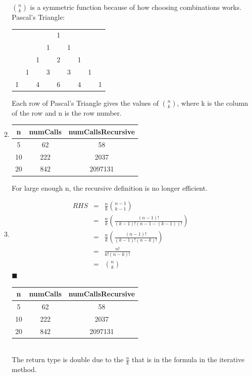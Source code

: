 \documentclass{article}
\newcommand*{\qed}{\hfill\ensuremath{\blacksquare}}
\begin{document}
\begin{enumerate}
$n\choose k$ is a symmetric function because of how choosing combinations works. Pascal's Triangle:\\
\begin{tabular}{ccccccccc}
	\hfill	&\hfill	&\hfill	& \hfill 	& 1	&\hfill	&\hfill	&\hfill	&\hfill\\
	\hfill	&\hfill	&\hfill	&1	& \hfill	& 1	& \hfill	&\hfill	&\hfill\\
	\hfill	&\hfill	&1	&\hfill	&2	&\hfill	&1	&\hfill	&\hfill\\
	\hfill	&1	&\hfill	&3	&\hfill	&3	&\hfill	&1	&\hfill\\
	1	&\hfill	&4	&\hfill	&6	&\hfill	&4	&\hfill	&1
\end{tabular}

Each row of Pascal's Triangle gives the values of $n\choose k$, where k is the column of the row and n is the row number. 

\item 
\begin{tabular}{|c|c|c|}
	\hline
	n	&numCalls	&numCallsRecursive \\
	\hline
	5	&62	&58 \\
	\hline
	10	&222		&2037 \\
	\hline
	20	&842		&2097131\\
	\hline
\end{tabular}

For large enough n, the recursive definition is no longer efficient. 

\item 
\begin{eqnarray*}
	RHS &=& \frac{n}{k}{{n-1}\choose{k-1}}\\
	&=& \frac{n}{k}\left(\frac{(n-1)!}{(k-1)!(n-1-(k-1))!}\right)\\
	&=& \frac{n}{k}\left(\frac{(n-1)!}{(k-1)!(n-k)!}\right)\\
	&=& \frac{n!}{k!(n-k)!}\\
	&=& {{n}\choose{k}}
\end{eqnarray*}
\qed\\
\begin{tabular}{|c|c|c|}
	\hline
	n	&numCalls	&numCallsRecursive \\
	\hline
	5	&62	&58 \\
	\hline
	10	&222		&2037 \\
	\hline
	20	&842		&2097131\\
	\hline
\end{tabular}\\
The return type is double due to the $\frac{n}{k}$ that is in the formula in the iterative method.


\end{enumerate}
\end{document}

